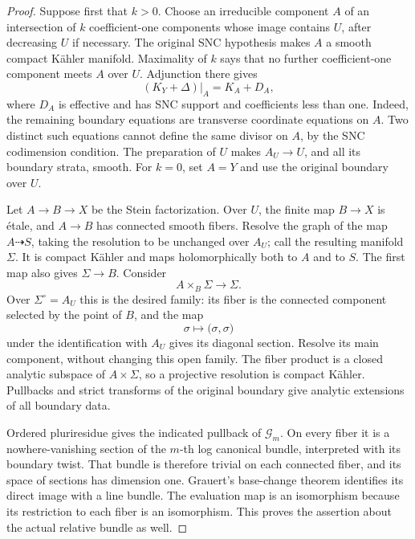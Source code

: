 \begin{proof}
Suppose first that \(k>0\).  Choose an irreducible component \(A\) of an
intersection of \(k\) coefficient-one components whose image contains
\(U\), after decreasing \(U\) if necessary.  The original SNC hypothesis
makes \(A\) a smooth compact K\"ahler manifold.  Maximality of \(k\) says
that no further coefficient-one component meets \(A\) over \(U\).
Adjunction there gives
\[
 (K_Y+\Delta)|_A=K_A+D_A,
\]
where \(D_A\) is effective and has SNC support and coefficients less than
one.  Indeed, the remaining boundary equations are transverse coordinate
equations on \(A\).  Two distinct such equations cannot define the same
divisor on \(A\), by the SNC codimension condition.  The preparation of
\(U\) makes \(A_U\to U\), and all its boundary strata, smooth.
For \(k=0\), set \(A=Y\) and use the original boundary over \(U\).

Let \(A\to B\to X\) be the Stein factorization.  Over \(U\), the finite
map \(B\to X\) is \'etale, and \(A\to B\) has connected smooth fibers.
Resolve the graph of the map \(A\dashrightarrow S\), taking the
resolution to be unchanged over \(A_U\); call the resulting manifold
\(\Sigma\).  It is compact K\"ahler and maps holomorphically both to
\(A\) and to \(S\).  The first map also gives \(\Sigma\to B\).  Consider
\[
 A\times_B\Sigma\longrightarrow\Sigma.
\]
Over \(\Sigma^\circ=A_U\) this is the desired family: its fiber is the
connected component selected by the point of \(B\), and the map
\[
 \sigma\longmapsto \bigl(\sigma,\sigma\bigr)
\]
under the identification with \(A_U\) gives its diagonal section.
Resolve its main component, without changing this open family.
The fiber product is a closed analytic subspace of \(A\times\Sigma\),
so a projective resolution is compact K\"ahler.  Pullbacks and strict
transforms of the original boundary give analytic extensions of all
boundary data.

Ordered pluriresidue gives the indicated pullback of
\(\mathcal G_m\).  On every fiber it is a nowhere-vanishing section of
the \(m\)-th log canonical bundle, interpreted with its boundary twist.
That bundle is therefore trivial on each connected fiber, and its
space of sections has dimension one.  Grauert's base-change theorem
identifies its direct image with a line bundle.  The evaluation map is
an isomorphism because its restriction to each fiber is an isomorphism.
This proves the assertion about the actual relative bundle as well.
\end{proof}

